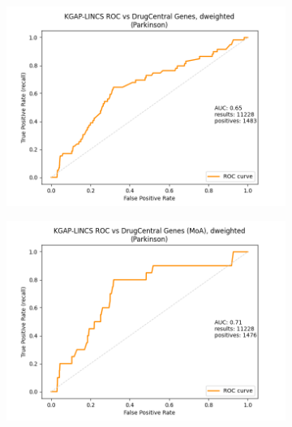 \begin{figure}[h]
\begin{subfigure}{0.5\textwidth}
\includegraphics[width=0.95\linewidth]{figures/kgap/KGAP-LINCS_ROC_dweighted_Parkinson.png} 
\caption{}
\label{fig:KGAP-LINCS_ROCsa}
\end{subfigure}
\begin{subfigure}{0.5\textwidth}
\includegraphics[width=0.95\linewidth]{figures/kgap/KGAP-LINCS_ROC_dweighted_MoA_Parkinson.png}
\caption{}
\label{fig:KGAP-LINCS_ROCsb}
\end{subfigure}


\end{figure}
